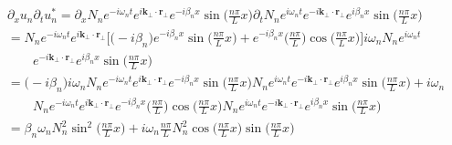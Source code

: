 \documentclass[english]{article}
\begin{document}
\begin{align*}
 & \partial_{x}u_{n}\partial_{t}u^{*}_{n}=\partial_{x}N_{n}e^{-i\omega_{n}t}e^{i\boldsymbol{k}_{\bot}\cdot\boldsymbol{r}_{\bot}}e^{-i\beta_{n}x}\sin\biggl(\frac{n\pi}{L}x\biggr)\partial_{t}N_{n}e^{i\omega_{n}t}e^{-i\boldsymbol{k}_{\bot}\cdot\boldsymbol{r}_{\bot}}e^{i\beta_{n}x}\sin\biggl(\frac{n\pi}{L}x\biggr)\\
 & =N_{n}e^{-i\omega_{n}t}e^{i\boldsymbol{k}_{\bot}\cdot\boldsymbol{r}_{\bot}}\biggl[\biggl(-i\beta_{n}\biggr)e^{-i\beta_{n}x}\sin\biggl(\frac{n\pi}{L}x\biggr)+e^{-i\beta_{n}x}\biggl(\frac{n\pi}{L}\biggr)\cos\biggl(\frac{n\pi}{L}x\biggr)\biggr]i\omega_{n}N_{n}e^{i\omega_{n}t}\\
 & \qquad e^{-i\boldsymbol{k}_{\bot}\cdot\boldsymbol{r}_{\bot}}e^{i\beta_{n}x}\sin\biggl(\frac{n\pi}{L}x\biggr)\\
 & =\biggl(-i\beta_{n}\biggr)i\omega_{n}N_{n}e^{-i\omega_{n}t}e^{i\boldsymbol{k}_{\bot}\cdot\boldsymbol{r}_{\bot}}e^{-i\beta_{n}x}\sin\biggl(\frac{n\pi}{L}x\biggr)N_{n}e^{i\omega_{n}t}e^{-i\boldsymbol{k}_{\bot}\cdot\boldsymbol{r}_{\bot}}e^{i\beta_{n}x}\sin\biggl(\frac{n\pi}{L}x\biggr)+i\omega_{n}\\
 & \qquad N_{n}e^{-i\omega_{n}t}e^{i\boldsymbol{k}_{\bot}\cdot\boldsymbol{r}_{\bot}}e^{-i\beta_{n}x}\biggl(\frac{n\pi}{L}\biggr)\cos\biggl(\frac{n\pi}{L}x\biggr)N_{n}e^{i\omega_{n}t}e^{-i\boldsymbol{k}_{\bot}\cdot\boldsymbol{r}_{\bot}}e^{i\beta_{n}x}\sin\biggl(\frac{n\pi}{L}x\biggr)\\
 & =\beta_{n}\omega_{n}N^{2}_{n}\sin^{2}\biggl(\frac{n\pi}{L}x\biggr)+i\omega_{n}\frac{n\pi}{L}N^{2}_{n}\cos\biggl(\frac{n\pi}{L}x\biggr)\sin\biggl(\frac{n\pi}{L}x\biggr)
\end{align*}
 {}
\end{document}
